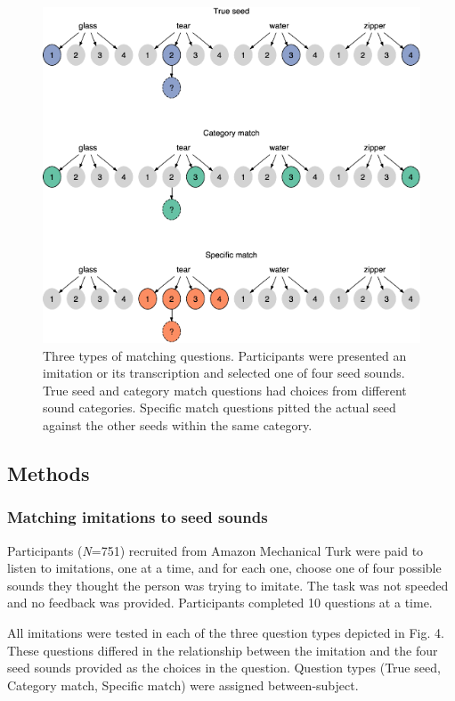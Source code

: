 \documentclass[english,floatsintext,man]{apa6}
\theoremstyle{definition}
\theoremstyle{definition}
\theoremstyle{definition}
\theoremstyle{remark}
\begin{document}
\begin{figure}
\centering
\includegraphics{fig3-1.pdf}
\caption{\label{fig:fig3}Three types of matching questions. Participants
were presented an imitation or its transcription and selected one of
four seed sounds. True seed and category match questions had choices
from different sound categories. Specific match questions pitted the
actual seed against the other seeds within the same category.}
\end{figure}

\hypertarget{methods-1}{%
\subsection{Methods}\label{methods-1}}

\hypertarget{matching-imitations-to-seed-sounds}{%
\subsubsection{Matching imitations to seed
sounds}\label{matching-imitations-to-seed-sounds}}

Participants (\emph{N}=751) recruited from Amazon Mechanical Turk were
paid to listen to imitations, one at a time, and for each one, choose
one of four possible sounds they thought the person was trying to
imitate. The task was not speeded and no feedback was provided.
Participants completed 10 questions at a time.

All imitations were tested in each of the three question types depicted
in Fig. 4. These questions differed in the relationship between the
imitation and the four seed sounds provided as the choices in the
question. Question types (True seed, Category match, Specific match)
were assigned between-subject.
\end{document}
